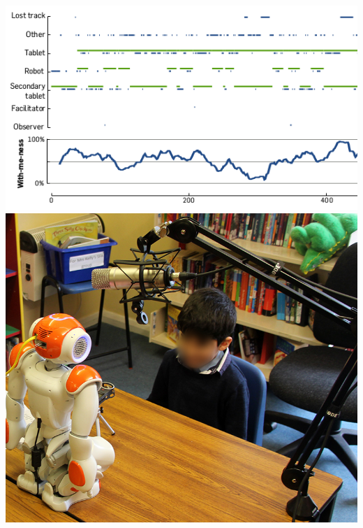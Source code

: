 \documentclass[xcolor=table]{beamer}
\begin{document}
\begin{frame}{}
            \hyperlink{withmeness}{\includegraphics[height=0.2\paperheight]{withmeness/withmeness}}
            \hspace{0.5em}
            \hyperlink{asr}{\includegraphics[height=0.2\paperheight]{speech-reco/record_img}}
            \hspace{0.5em}

\end{frame}
\end{document}
